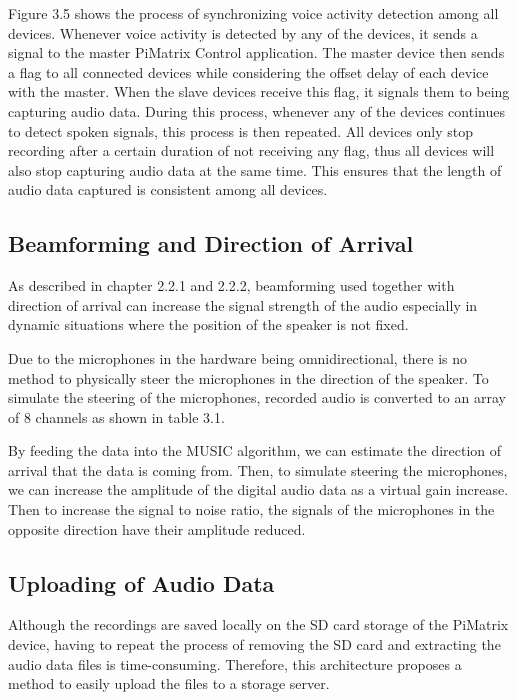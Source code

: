 \documentclass[hidelinks,12pt]{report} %
\begin{document}
Figure 3.5 shows the process of synchronizing voice activity detection among all devices. Whenever voice activity is detected by any of the devices, it sends a signal to the master PiMatrix Control application. The master device then sends a flag to all connected devices while considering the offset delay of each device with the master. When the slave devices receive this flag, it signals them to being capturing audio data. During this process, whenever any of the devices continues to detect spoken signals, this process is then repeated. All devices only stop recording after a certain duration of not receiving any flag, thus all devices will also stop capturing audio data at the same time. This ensures that the length of audio data captured is consistent among all devices.  

\subsection{Beamforming and Direction of Arrival}

As described in chapter 2.2.1 and 2.2.2, beamforming used together with direction of arrival can increase the signal strength of the audio especially in dynamic situations where the position of the speaker is not fixed\cite{9}.

Due to the microphones in the hardware being omnidirectional, there is no method to physically steer the microphones in the direction of the speaker. To simulate the steering of the microphones, recorded audio is converted to an array of 8 channels as shown in table 3.1.

By feeding the data into the MUSIC algorithm, we can estimate the direction of arrival that the data is coming from\cite{11}. Then, to simulate steering the microphones, we can increase the amplitude of the digital audio data as a virtual gain increase. Then to increase the signal to noise ratio, the signals of the microphones in the opposite direction have their amplitude reduced.    

\subsection{Uploading of Audio Data}

Although the recordings are saved locally on the SD card storage of the PiMatrix device, having to repeat the process of removing the SD card and extracting the audio data files is time-consuming. Therefore, this architecture proposes a method to easily upload the files to a storage server. 
\end{document}
